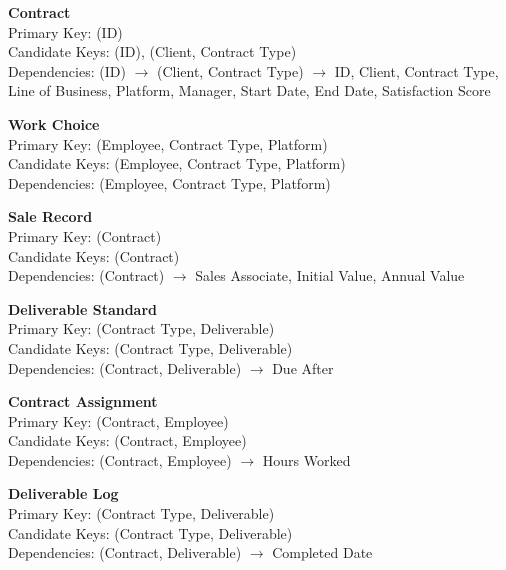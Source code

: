 \documentclass[12pt, letterpaper]{article}
\begin{document}
\textbf{Contract}\\
Primary Key: (ID)\\
Candidate Keys: (ID), (Client, Contract Type)\\
Dependencies: (ID) $\rightarrow$ (Client, Contract Type) $\rightarrow$ ID, Client, Contract Type, Line of Business, Platform, Manager, Start Date, End Date, Satisfaction Score

\textbf{Work Choice}\\
Primary Key: (Employee, Contract Type, Platform)\\
Candidate Keys: (Employee, Contract Type, Platform)\\
Dependencies: (Employee, Contract Type, Platform)

\textbf{Sale Record}\\
Primary Key: (Contract)\\
Candidate Keys: (Contract)\\
Dependencies: (Contract) $\rightarrow$ Sales Associate, Initial Value, Annual Value

\textbf{Deliverable Standard}\\
Primary Key: (Contract Type, Deliverable)\\
Candidate Keys: (Contract Type, Deliverable)\\
Dependencies: (Contract, Deliverable) $\rightarrow$ Due After

\textbf{Contract Assignment}\\
Primary Key: (Contract, Employee)\\
Candidate Keys: (Contract, Employee)\\
Dependencies: (Contract, Employee) $\rightarrow$ Hours Worked

\textbf{Deliverable Log}\\
Primary Key: (Contract Type, Deliverable)\\
Candidate Keys: (Contract Type, Deliverable)\\
Dependencies: (Contract, Deliverable) $\rightarrow$ Completed Date
\end{document}
